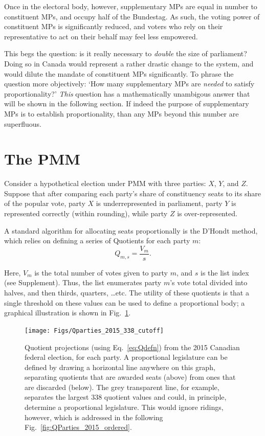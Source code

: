 \documentclass[DIV=calc, paper=a4, fontsize=11pt, twocolumn]{scrartcl}	 %
\begin{document}
Once in the electoral body, however, supplementary MPs are equal in number to constituent MPs, and occupy half of the Bundestag. As such, the voting power of constituent MPs is significantly reduced, and voters who rely on their representative to act on their behalf may feel less empowered.

This begs the question: is it really necessary to \emph{double} the size of parliament? Doing so in Canada would represent a rather drastic change to the system, and would dilute the mandate of constituent MPs significantly. To phrase the question more objectively: `How many supplementary MPs are \emph{needed} to satisfy proportionality?' 
\emph{This} question has a mathematically unambigous answer that will be shown in the following section. If indeed the purpose of supplementary MPs is to establish proportionality, than any MPs beyond this number are superfluous.

\section{The PMM}
\label{sec:model_proposal}

Consider a hypothetical election under PMM with three parties: $X$, $Y$, and $Z$. Suppose that after comparing each party's share of constituency seats to its share of the popular vote, party $X$ is underrepresented in parliament, party $Y$ is represented correctly (within rounding), while party $Z$ is over-represented. 

A standard algorithm for allocating seats proportionally is the D'Hondt method, which relies on defining a series of Quotients for each party $m$:
\begin{equation}
\label{eq:Qdefn}
Q_{m,s} = \frac{V_m}{s}.
\end{equation}

Here, $V_m$ is the total number of votes given to party $m$, and $s$ is the list index (see Supplement). 
Thus, the list enumerates party $m$'s vote total divided into halves, and then thirds, quarters, \ldots etc. The utility of these quotients is that a single threshold on these values can be used to define a proportional body; a graphical illustration is shown in Fig.~\ref{fig:Qparties_2015_338_cutoff}. 


\begin{figure}[h!]
  \texttt{[image: Figs/Qparties\_2015\_338\_cutoff]}
  \captionsetup{format=default}
  \caption{Quotient projections (using Eq.~\ref{eq:Qdefn}) from the 2015 Canadian federal election, for each party. A proportional legislature can be defined by drawing a horizontal line anywhere on this graph, separating quotients that are awarded seats (above) from ones that are discarded (below). The grey transparent line, for example, separates the largest 338 quotient values and could, in principle, determine a proportional legislature. This would ignore ridings, however, which is addressed in the following Fig.~\ref{fig:QParties_2015_ordered}. }
\label{fig:Qparties_2015_338_cutoff}
\end{figure}
\end{document}
